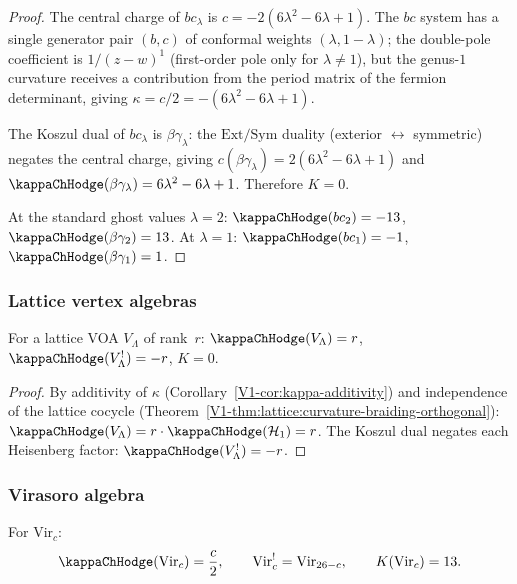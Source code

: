 \begin{proof}
The central charge of $bc_\lambda$ is $c = -2(6\lambda^2 - 6\lambda + 1)$.
The $bc$ system has a single generator pair $(b, c)$ of conformal weights
$(\lambda, 1 - \lambda)$; the double-pole coefficient is $1/(z-w)^1$
(first-order pole only for $\lambda \neq 1$), but the genus-$1$
curvature receives a contribution from the period matrix of the
fermion determinant, giving $\kappa = c/2 = -(6\lambda^2 - 6\lambda + 1)$.

The Koszul dual of $bc_\lambda$ is $\beta\gamma_\lambda$: the
$\mathrm{Ext}/\mathrm{Sym}$ duality (exterior $\leftrightarrow$
symmetric) negates the central charge, giving
$c(\beta\gamma_\lambda) = 2(6\lambda^2 - 6\lambda + 1)$ and
$\kappaChHodge(\beta\gamma_\lambda) = 6\lambda^2 - 6\lambda + 1$.
Therefore $K = 0$.

At the standard ghost values $\lambda = 2$: $\kappaChHodge(bc_2) = -13$,
$\kappaChHodge(\beta\gamma_2) = 13$.
At $\lambda = 1$: $\kappaChHodge(bc_1) = -1$, $\kappaChHodge(\beta\gamma_1) = 1$.
\end{proof}

\subsubsection{Lattice vertex algebras}

\begin{proposition}
For a lattice VOA $V_\Lambda$ of rank~$r$:
$\kappaChHodge(V_\Lambda) = r$, $\kappaChHodge(V_\Lambda^!) = -r$, $K = 0$.
\end{proposition}

\begin{proof}
By additivity of $\kappa$ (Corollary~\ref{V1-cor:kappa-additivity}) and
independence of the lattice cocycle
(Theorem~\ref{V1-thm:lattice:curvature-braiding-orthogonal}):
$\kappaChHodge(V_\Lambda) = r \cdot \kappaChHodge(\cH_1) = r$.
The Koszul dual negates each Heisenberg factor: $\kappaChHodge(V_\Lambda^!) = -r$.
\end{proof}

\subsubsection{Virasoro algebra}

\begin{theorem}
\label{thm:thqg-IV-virasoro-K}
For $\mathrm{Vir}_c$:
\begin{equation}%
\kappaChHodge(\mathrm{Vir}_c) = \frac{c}{2},
\qquad
\mathrm{Vir}_c^! = \mathrm{Vir}_{26-c},
\qquad
K(\mathrm{Vir}_c) = 13.
\end{equation}
\end{theorem}

